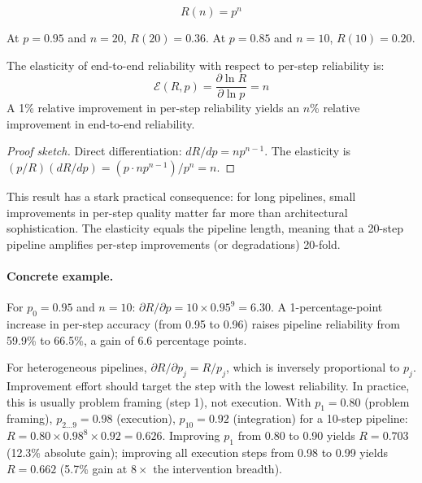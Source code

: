 \begin{equation}
    R(n) = p^n
\end{equation}

At $p = 0.95$ and $n = 20$, $R(20) = 0.36$. At $p = 0.85$ and $n = 10$, $R(10) = 0.20$.

\begin{theorem}
\label{thm:compound-sensitivity}
The elasticity of end-to-end reliability with respect to per-step reliability is:
\begin{equation}
    \mathcal{E}(R, p) = \frac{\partial \ln R}{\partial \ln p} = n
\end{equation}
A 1\% relative improvement in per-step reliability yields an $n$\% relative improvement in end-to-end reliability.
\end{theorem}

\begin{proof}[Proof sketch]
Direct differentiation: $dR/dp = n p^{n-1}$. The elasticity is $(p/R)(dR/dp) = (p \cdot n p^{n-1}) / p^n = n$.
\end{proof}

This result has a stark practical consequence: for long pipelines, small improvements in per-step quality matter far more than architectural sophistication. The elasticity equals the pipeline length, meaning that a 20-step pipeline amplifies per-step improvements (or degradations) 20-fold.

\paragraph{Concrete example.} For $p_0 = 0.95$ and $n = 10$: $\partial R/\partial p = 10 \times 0.95^9 = 6.30$. A 1-percentage-point increase in per-step accuracy (from 0.95 to 0.96) raises pipeline reliability from 59.9\% to 66.5\%, a gain of 6.6 percentage points.

For heterogeneous pipelines, $\partial R / \partial p_j = R / p_j$, which is inversely proportional to $p_j$. Improvement effort should target the step with the lowest reliability. In practice, this is usually problem framing (step 1), not execution. With $p_1 = 0.80$ (problem framing), $p_{2 \ldots 9} = 0.98$ (execution), $p_{10} = 0.92$ (integration) for a 10-step pipeline: $R = 0.80 \times 0.98^8 \times 0.92 = 0.626$. Improving $p_1$ from 0.80 to 0.90 yields $R = 0.703$ (12.3\% absolute gain); improving all execution steps from 0.98 to 0.99 yields $R = 0.662$ (5.7\% gain at $8\times$ the intervention breadth).

